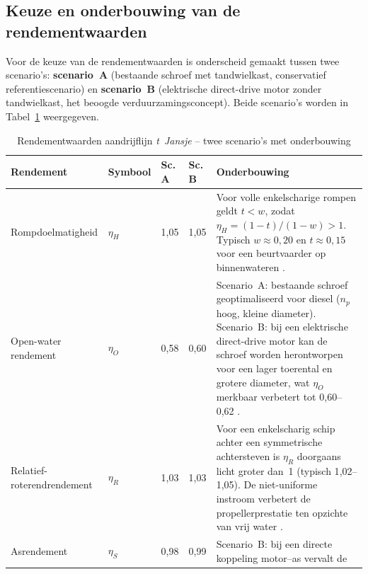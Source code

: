 \subsection{Keuze en onderbouwing van de rendementwaarden}
\label{subsec:rendementen}
 
Voor de keuze van de rendementwaarden is onderscheid gemaakt tussen twee scenario's:
\textbf{scenario~A} (bestaande schroef met tandwielkast, conservatief referentiescenario)
en \textbf{scenario~B} (elektrische direct-drive motor zonder tandwielkast, het beoogde
verduurzamingsconcept). Beide scenario's worden in Tabel~\ref{tab:rendementen} weergegeven.
 
\begin{table}[H]
    \centering
    \caption{Rendementwaarden aandrijflijn \emph{t~Jansje} – twee scenario's met onderbouwing}
    \label{tab:rendementen}
    \begin{tabular}{p{3.2cm} l p{1.2cm} p{1.2cm} p{6.0cm}}
        \toprule
        Rendement & Symbool & Sc.\,A & Sc.\,B & Onderbouwing \\
        \midrule
        Rompdoelmatigheid
            & $\eta_H$
            & 1{,}05
            & 1{,}05
            & Voor volle enkelscharige rompen geldt $t < w$, zodat
              $\eta_H = (1-t)/(1-w) > 1$.
              Typisch $w \approx 0{,}20$ en $t \approx 0{,}15$ voor een
              beurtvaarder op binnenwateren \cite{Molland2011}. \\[6pt]
        Open-water rendement
            & $\eta_O$
            & 0{,}58
            & 0{,}60
            & Scenario~A: bestaande schroef geoptimaliseerd voor diesel
              ($n_p$ hoog, kleine diameter). Scenario~B: bij een elektrische
              direct-drive motor kan de schroef worden herontworpen voor een
              lager toerental en grotere diameter, wat $\eta_O$ merkbaar
              verbetert tot 0{,}60--0{,}62 \cite{Molland2011, Schneekluth1998}. \\[6pt]
        Relatief-roterendrendement
            & $\eta_R$
            & 1{,}03
            & 1{,}03
            & Voor een enkelscharig schip achter een symmetrische achtersteven
              is $\eta_R$ doorgaans licht groter dan~1 (typisch 1{,}02--1{,}05).
              De niet-uniforme instroom verbetert de propellerprestatie ten
              opzichte van vrij water \cite{Molland2011}. \\[6pt]
        Asrendement
            & $\eta_S$
            & 0{,}98
            & 0{,}99
            & Scenario~B: bij een directe koppeling motor–as vervalt de

\end{tabular}
\end{table}
